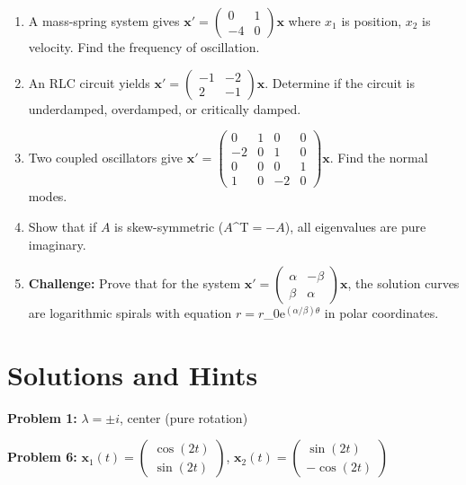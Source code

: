 \documentclass[12pt]{article}
\begin{document}
\begin{enumerate}[start=26]
\item A mass-spring system gives $\mathbf{x}' = \begin{pmatrix} 0 & 1 \\ -4 & 0 \end{pmatrix}\mathbf{x}$ where $x_{1}$ is position, $x_{2}$ is velocity. Find the frequency of oscillation.

\item An RLC circuit yields $\mathbf{x}' = \begin{pmatrix} -1 & -2 \\ 2 & -1 \end{pmatrix}\mathbf{x}$. Determine if the circuit is underdamped, overdamped, or critically damped.

\item Two coupled oscillators give $\mathbf{x}' = \begin{pmatrix} 0 & 1 & 0 & 0 \\ -2 & 0 & 1 & 0 \\ 0 & 0 & 0 & 1 \\ 1 & 0 & -2 & 0 \end{pmatrix}\mathbf{x}$. Find the normal modes.

\item Show that if $A$ is skew-symmetric ($A$^{T}$ = -A$), all eigenvalues are pure imaginary.

\item \textbf{Challenge:} Prove that for the system $\mathbf{x}' = \begin{pmatrix} \alpha & -\beta \\ \beta & \alpha \end{pmatrix}\mathbf{x}$, the solution curves are logarithmic spirals with equation $r = r$_{0e}$^{(\alpha/\beta)\theta}$ in polar coordinates.
\end{enumerate}

\section*{Solutions and Hints}

\textbf{Problem 1:} $\lambda = \pm i$, center (pure rotation)

\textbf{Problem 6:} $\mathbf{x}_{1}(t) = \begin{pmatrix} \cos(2t) \\ \sin(2t) \end{pmatrix}$, $\mathbf{x}_{2}(t) = \begin{pmatrix} \sin(2t) \\ -\cos(2t) \end{pmatrix}$
\end{document}
